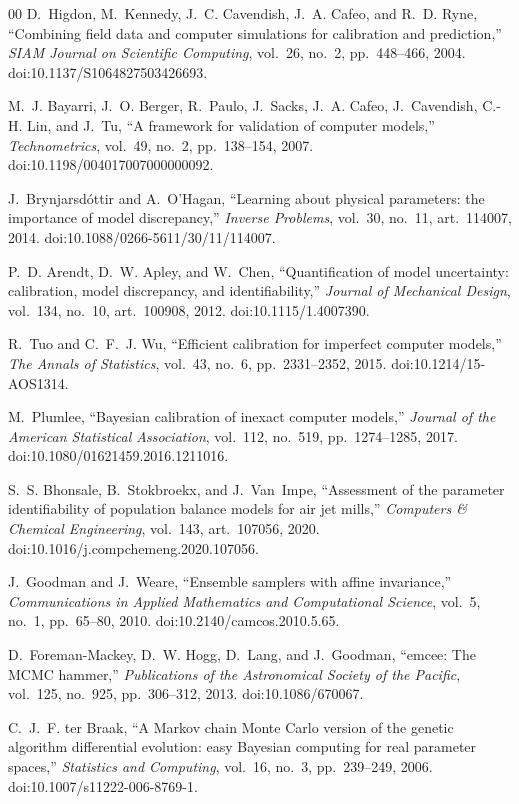 \documentclass[journal]{IEEEtran}
\begin{document}
\begin{thebibliography}{00}
 D.~Higdon, M.~Kennedy, J.~C. Cavendish, J.~A. Cafeo, and R.~D. Ryne, ``Combining field data and computer
simulations for calibration and prediction,'' \emph{SIAM Journal on Scientific Computing}, vol.~26, no.~2,
pp.~448--466, 2004. doi:10.1137/S1064827503426693.

 M.~J. Bayarri, J.~O. Berger, R.~Paulo, J.~Sacks, J.~A. Cafeo, J.~Cavendish, C.-H. Lin, and J.~Tu, ``A
framework for validation of computer models,'' \emph{Technometrics}, vol.~49, no.~2, pp.~138--154, 2007.
doi:10.1198/004017007000000092.

 J.~Brynjarsd\'ottir and A.~O'Hagan, ``Learning about physical parameters: the importance of model
discrepancy,'' \emph{Inverse Problems}, vol.~30, no.~11, art.~114007, 2014. doi:10.1088/0266-5611/30/11/114007.

 P.~D. Arendt, D.~W. Apley, and W.~Chen, ``Quantification of model uncertainty: calibration, model
discrepancy, and identifiability,'' \emph{Journal of Mechanical Design}, vol.~134, no.~10, art.~100908, 2012.
doi:10.1115/1.4007390.

 R.~Tuo and C.~F.~J. Wu, ``Efficient calibration for imperfect computer models,'' \emph{The Annals of
Statistics}, vol.~43, no.~6, pp.~2331--2352, 2015. doi:10.1214/15-AOS1314.

 M.~Plumlee, ``Bayesian calibration of inexact computer models,'' \emph{Journal of the American
Statistical Association}, vol.~112, no.~519, pp.~1274--1285, 2017. doi:10.1080/01621459.2016.1211016.

 S.~S. Bhonsale, B.~Stokbroekx, and J.~Van~Impe, ``Assessment of the parameter identifiability of
population balance models for air jet mills,'' \emph{Computers \& Chemical Engineering}, vol.~143, art.~107056, 2020.
doi:10.1016/j.compchemeng.2020.107056.

 J.~Goodman and J.~Weare, ``Ensemble samplers with affine invariance,'' \emph{Communications in Applied
Mathematics and Computational Science}, vol.~5, no.~1, pp.~65--80, 2010. doi:10.2140/camcos.2010.5.65.

 D.~Foreman-Mackey, D.~W. Hogg, D.~Lang, and J.~Goodman, ``emcee: The MCMC hammer,'' \emph{Publications of
the Astronomical Society of the Pacific}, vol.~125, no.~925, pp.~306--312, 2013. doi:10.1086/670067.

 C.~J.~F. ter Braak, ``A Markov chain Monte Carlo version of the genetic algorithm differential evolution:
easy Bayesian computing for real parameter spaces,'' \emph{Statistics and Computing}, vol.~16, no.~3, pp.~239--249, 2006.
doi:10.1007/s11222-006-8769-1.


\end{thebibliography}
\end{document}

